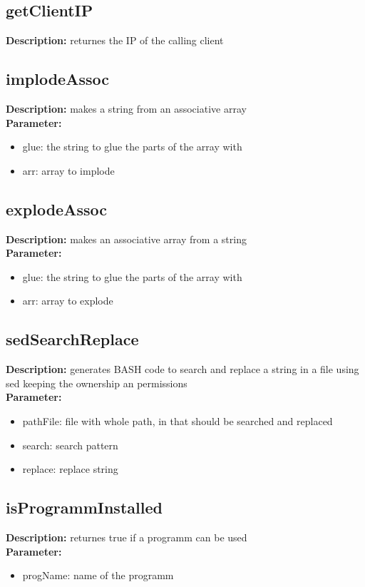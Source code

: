 \subsection{getClientIP}
\textbf{Description:} returnes the IP of the calling client\\

\subsection{implodeAssoc}
\textbf{Description:} makes a string from an associative array\\
\textbf{Parameter:}
\begin{itemize}
\item glue: the string to glue the parts of the array with
\item arr: array to implode
\end{itemize}

\subsection{explodeAssoc}
\textbf{Description:} makes an associative array from a string\\
\textbf{Parameter:}
\begin{itemize}
\item glue: the string to glue the parts of the array with
\item arr: array to explode
\end{itemize}

\subsection{sedSearchReplace}
\textbf{Description:} generates BASH code to search and replace a string in a file using sed keeping the ownership an permissions\\
\textbf{Parameter:}
\begin{itemize}
\item pathFile: file with whole path, in that should be searched and replaced
\item search: search pattern
\item replace: replace string
\end{itemize}

\subsection{isProgrammInstalled}
\textbf{Description:} returnes true if a programm can be used\\
\textbf{Parameter:}
\begin{itemize}
\item progName: name of the programm
\end{itemize}


